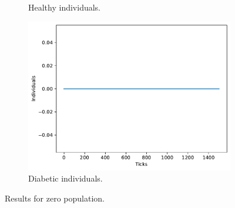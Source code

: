 \begin{figure}[H]
\begin{subfigure}[b]{0.3\columnwidth}
            \caption{Healthy individuals.}
            \label{subfig:sol}
        \end{subfigure}
        \begin{subfigure}[b]{0.3\columnwidth}
            \centering
            \includegraphics[width=\columnwidth]{files/population-0-diabetes.pdf}
            \caption{Diabetic individuals.}
            \label{subfig:adj}
        \end{subfigure}
        \caption{Results for zero population.}
        \label{fig:pop0}
	\end{figure}

